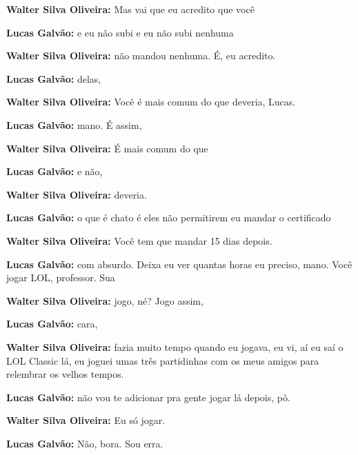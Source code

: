 \textbf{Walter Silva Oliveira:} Mas vai que eu acredito que você



\textbf{Lucas Galvão:} e eu não subi e eu não subi nenhuma



\textbf{Walter Silva Oliveira:} não mandou nenhuma. É, eu acredito.



\textbf{Lucas Galvão:} delas,



\textbf{Walter Silva Oliveira:} Você é mais comum do que deveria, Lucas.



\textbf{Lucas Galvão:} mano. É assim,



\textbf{Walter Silva Oliveira:} É mais comum do que



\textbf{Lucas Galvão:} e não,



\textbf{Walter Silva Oliveira:} deveria.



\textbf{Lucas Galvão:} o que é chato é eles não permitirem eu mandar o certificado



\textbf{Walter Silva Oliveira:} Você tem que mandar 15 dias depois.



\textbf{Lucas Galvão:} com absurdo. Deixa eu ver quantas horas eu preciso, mano. Você jogar LOL, professor. Sua



\textbf{Walter Silva Oliveira:} jogo, né? Jogo assim,



\textbf{Lucas Galvão:} cara,



\textbf{Walter Silva Oliveira:} fazia muito tempo quando eu jogava, eu vi, aí eu saí o LOL Classic lá, eu joguei umas três partidinhas com os meus amigos para relembrar os velhos tempos.



\textbf{Lucas Galvão:} não vou te adicionar pra gente jogar lá depois, pô.



\textbf{Walter Silva Oliveira:} Eu só jogar.



\textbf{Lucas Galvão:} Não, bora. Sou erra.



